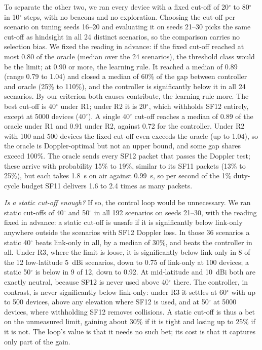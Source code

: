 \documentclass[journal]{IEEEtran}
\begin{document}
To separate the other two, we ran every device with a fixed cut-off of 20$^\circ$ to 80$^\circ$ in 10$^\circ$ steps, with no beacons and no exploration. Choosing the cut-off per scenario on tuning seeds 16--20 and evaluating it on seeds 21--30 picks the same cut-off as hindsight in all 24 distinct scenarios, so the comparison carries no selection bias. We fixed the reading in advance: if the fixed cut-off reached at most 0.80 of the oracle (median over the 24 scenarios), the threshold class would be the limit; at 0.90 or more, the learning rule. It reached a median of 0.89 (range 0.79 to 1.04) and closed a median of 60\% of the gap between controller and oracle (25\% to 110\%), and the controller is significantly below it in all 24 scenarios. By our criterion both causes contribute, the learning rule more. The best cut-off is 40$^\circ$ under R1; under R2 it is 20$^\circ$, which withholds SF12 entirely, except at 5000 devices (40$^\circ$). A single 40$^\circ$ cut-off reaches a median of 0.89 of the oracle under R1 and 0.91 under R2, against 0.72 for the controller. Under R2 with 100 and 500 devices the fixed cut-off even exceeds the oracle (up to 1.04), so the oracle is Doppler-optimal but not an upper bound, and some gap shares exceed 100\%. The oracle sends every SF12 packet that passes the Doppler test; these arrive with probability 15\% to 19\%, similar to its SF11 packets (13\% to 25\%), but each takes 1.8~s on air against 0.99~s, so per second of the 1\% duty-cycle budget SF11 delivers 1.6 to 2.4 times as many packets.

\emph{Is a static cut-off enough?} If so, the control loop would be unnecessary. We ran static cut-offs of 40$^\circ$ and 50$^\circ$ in all 192 scenarios on seeds 21--30, with the reading fixed in advance: a static cut-off is unsafe if it is significantly below link-only anywhere outside the scenarios with SF12 Doppler loss. In those 36 scenarios a static 40$^\circ$ beats link-only in all, by a median of 30\%, and beats the controller in all. Under R3, where the limit is loose, it is significantly below link-only in 8 of the 12 low-latitude 5~dBi scenarios, down to 0.75 of link-only at 100 devices; a static 50$^\circ$ is below in 9 of 12, down to 0.92. At mid-latitude and 10~dBi both are exactly neutral, because SF12 is never used above 40$^\circ$ there. The controller, in contrast, is never significantly below link-only: under R3 it settles at 60$^\circ$ with up to 500 devices, above any elevation where SF12 is used, and at 50$^\circ$ at 5000 devices, where withholding SF12 removes collisions. A static cut-off is thus a bet on the unmeasured limit, gaining about 30\% if it is tight and losing up to 25\% if it is not. The loop's value is that it needs no such bet; its cost is that it captures only part of the gain.
\end{document}
